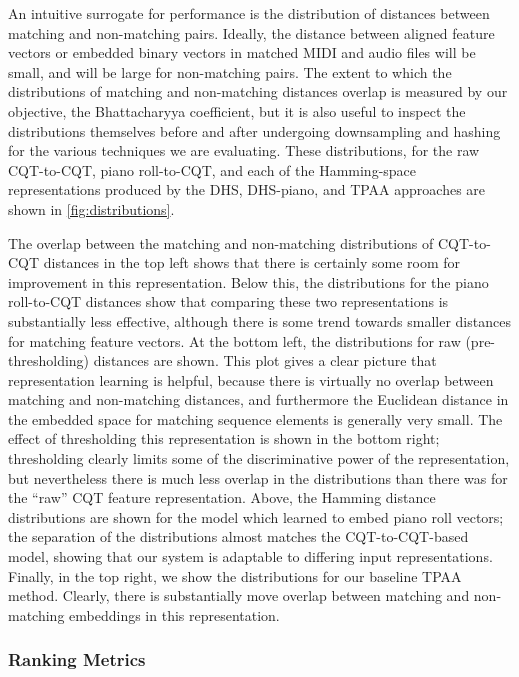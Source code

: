 An intuitive surrogate for performance is the distribution of distances between matching and non-matching pairs.
Ideally, the distance between aligned feature vectors or embedded binary vectors in matched MIDI and audio files will be small, and will be large for non-matching pairs.
The extent to which the distributions of matching and non-matching distances overlap is measured by our objective, the Bhattacharyya coefficient, but it is also useful to inspect the distributions themselves before and after undergoing downsampling and hashing for the various techniques we are evaluating.
These distributions, for the raw CQT-to-CQT, piano roll-to-CQT, and each of the Hamming-space representations produced by the DHS, DHS-piano, and TPAA approaches are shown in \cref{fig:distributions}.

The overlap between the matching and non-matching distributions of CQT-to-CQT distances in the top left shows that there is certainly some room for improvement in this representation.
Below this, the distributions for the piano roll-to-CQT distances show that comparing these two representations is substantially less effective, although there is some trend towards smaller distances for matching feature vectors.
At the bottom left, the distributions for raw (pre-thresholding) distances are shown.
This plot gives a clear picture that representation learning is helpful, because there is virtually no overlap between matching and non-matching distances, and furthermore the Euclidean distance in the embedded space for matching sequence elements is generally very small.
The effect of thresholding this representation is shown in the bottom right; thresholding clearly limits some of the discriminative power of the representation, but nevertheless there is much less overlap in the distributions than there was for the ``raw'' CQT feature representation.
Above, the Hamming distance distributions are shown for the model which learned to embed piano roll vectors; the separation of the distributions almost matches the CQT-to-CQT-based model, showing that our system is adaptable to differing input representations.
Finally, in the top right, we show the distributions for our baseline TPAA method.
Clearly, there is substantially move overlap between matching and non-matching embeddings in this representation.

\subsubsection{Ranking Metrics}
\label{sec:ranking}


